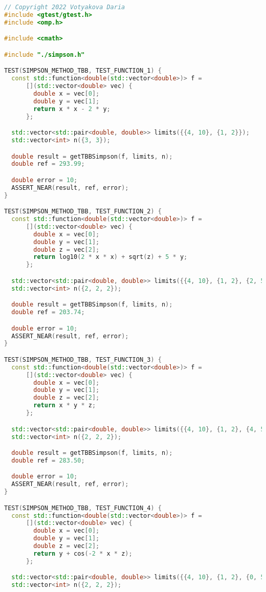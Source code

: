 \documentclass{report}
\begin{document}
\begin{lstlisting}[language=C++]
// Copyright 2022 Votyakova Daria
#include <gtest/gtest.h>
#include <omp.h>

#include <cmath>

#include "./simpson.h"

TEST(SIMPSON_METHOD_TBB, TEST_FUNCTION_1) {
  const std::function<double(std::vector<double>)> f =
      [](std::vector<double> vec) {
        double x = vec[0];
        double y = vec[1];
        return x * x - 2 * y;
      };

  std::vector<std::pair<double, double>> limits({{4, 10}, {1, 2}});
  std::vector<int> n({3, 3});

  double result = getTBBSimpson(f, limits, n);
  double ref = 293.99;

  double error = 10;
  ASSERT_NEAR(result, ref, error);
}

TEST(SIMPSON_METHOD_TBB, TEST_FUNCTION_2) {
  const std::function<double(std::vector<double>)> f =
      [](std::vector<double> vec) {
        double x = vec[0];
        double y = vec[1];
        double z = vec[2];
        return log10(2 * x * x) + sqrt(z) + 5 * y;
      };

  std::vector<std::pair<double, double>> limits({{4, 10}, {1, 2}, {2, 5}});
  std::vector<int> n({2, 2, 2});

  double result = getTBBSimpson(f, limits, n);
  double ref = 203.74;

  double error = 10;
  ASSERT_NEAR(result, ref, error);
}

TEST(SIMPSON_METHOD_TBB, TEST_FUNCTION_3) {
  const std::function<double(std::vector<double>)> f =
      [](std::vector<double> vec) {
        double x = vec[0];
        double y = vec[1];
        double z = vec[2];
        return x * y * z;
      };

  std::vector<std::pair<double, double>> limits({{4, 10}, {1, 2}, {4, 5}});
  std::vector<int> n({2, 2, 2});

  double result = getTBBSimpson(f, limits, n);
  double ref = 283.50;

  double error = 10;
  ASSERT_NEAR(result, ref, error);
}

TEST(SIMPSON_METHOD_TBB, TEST_FUNCTION_4) {
  const std::function<double(std::vector<double>)> f =
      [](std::vector<double> vec) {
        double x = vec[0];
        double y = vec[1];
        double z = vec[2];
        return y + cos(-2 * x * z);
      };

  std::vector<std::pair<double, double>> limits({{4, 10}, {1, 2}, {0, 5}});
  std::vector<int> n({2, 2, 2});


\end{lstlisting}
\end{document}
